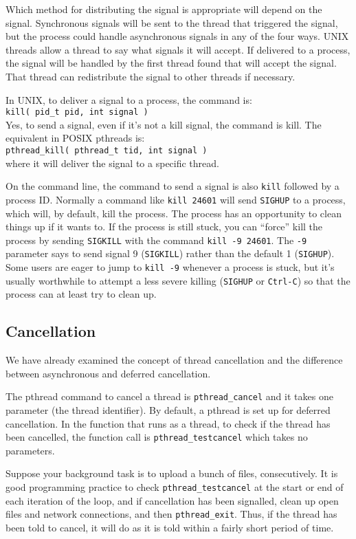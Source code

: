 Which method for distributing the signal is appropriate will depend on the signal. Synchronous signals will be sent to the thread that triggered the signal, but the process could handle asynchronous signals in any of the four ways. UNIX threads allow a thread to say what signals it will accept. If delivered to a process, the signal will be handled by the first thread found that will accept the signal. That thread can redistribute the signal to other threads if necessary.

In UNIX, to deliver a signal to a process, the command is:\\
\texttt{kill( pid\_t pid, int signal )}\\
Yes, to send a signal, even if it's not a kill signal, the command is kill. The equivalent in POSIX pthreads is:\\
\texttt{pthread\_kill( pthread\_t tid, int signal )}\\
where it will deliver the signal to a specific thread.

On the command line, the command to send a signal is also \texttt{kill} followed by a process ID. Normally a command like \texttt{kill 24601} will send \texttt{SIGHUP} to a process, which will, by default, kill the process. The process has an opportunity to clean things up if it wants to. If the process is still stuck, you can ``force'' kill the process by sending \texttt{SIGKILL} with the command \texttt{kill -9 24601}. The \texttt{-9} parameter says to send signal 9 (\texttt{SIGKILL}) rather than the default 1 (\texttt{SIGHUP}). Some users are eager to jump to \texttt{kill -9} whenever a process is stuck, but it's usually worthwhile to attempt a less severe killing (\texttt{SIGHUP} or \texttt{Ctrl-C}) so that the process can at least try to clean up.

\subsection*{Cancellation}

We have already examined the concept of thread cancellation and the difference between asynchronous and deferred cancellation.

The pthread command to cancel a thread is \texttt{pthread\_cancel} and it takes one parameter (the thread identifier). By default, a pthread is set up for deferred cancellation. In the function that runs as a thread, to check if the thread has been cancelled, the function call is \texttt{pthread\_testcancel} which takes no parameters.

Suppose your background task is to upload a bunch of files, consecutively. It is good programming practice to check \texttt{pthread\_testcancel} at the start or end of each iteration of the loop, and if cancellation has been signalled, clean up open files and network connections, and then \texttt{pthread\_exit}. Thus, if the thread has been told to cancel, it will do as it is told within a fairly short period of time.



